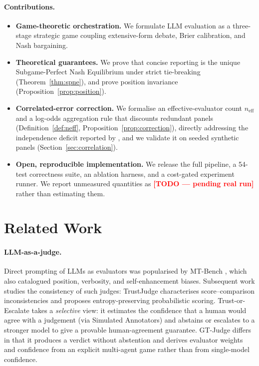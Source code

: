\documentclass[11pt]{article}
\newcommand{\neff}{n_{\mathrm{eff}}}
\newcommand{\todo}[1]{\textcolor{red}{\textbf{[TODO --- #1]}}}
\begin{document}
\paragraph{Contributions.}
\begin{itemize}[leftmargin=1.4em]
  \item \textbf{Game-theoretic orchestration.} We formulate LLM evaluation as a
  three-stage strategic game coupling extensive-form debate, Brier calibration,
  and Nash bargaining.
  \item \textbf{Theoretical guarantees.} We prove that concise reporting is the
  unique Subgame-Perfect Nash Equilibrium under strict tie-breaking
  (Theorem~\ref{thm:spne}), and prove position invariance
  (Proposition~\ref{prop:position}).
  \item \textbf{Correlated-error correction.} We formalise an effective-evaluator
  count $\neff$ and a log-odds aggregation rule that discounts redundant panels
  (Definition~\ref{def:neff}, Proposition~\ref{prop:correction}), directly
  addressing the independence deficit reported by \citet{kohli2026}, and we
  validate it on seeded synthetic panels (Section~\ref{sec:correlation}).
  \item \textbf{Open, reproducible implementation.} We release the full
  pipeline, a 54-test correctness suite, an ablation harness, and a cost-gated
  experiment runner. We report unmeasured quantities as \todo{pending real run}
  rather than estimating them.
\end{itemize}

\section{Related Work}
\paragraph{LLM-as-a-judge.} Direct prompting of LLMs as evaluators was
popularised by MT-Bench \citep{zheng2023}, which also catalogued position,
verbosity, and self-enhancement biases. Subsequent work studies the
consistency of such judges: TrustJudge \citep{trustjudge2025} characterises
score--comparison inconsistencies and proposes entropy-preserving probabilistic
scoring. Trust-or-Escalate \citep{jung2025} takes a \emph{selective} view:
it estimates the confidence that a human would agree with a judgement (via
Simulated Annotators) and abstains or escalates to a stronger model to give a
provable human-agreement guarantee. GT-Judge differs in that it produces a
verdict without abstention and derives evaluator weights and confidence from an
explicit multi-agent game rather than from single-model confidence.
\end{document}
